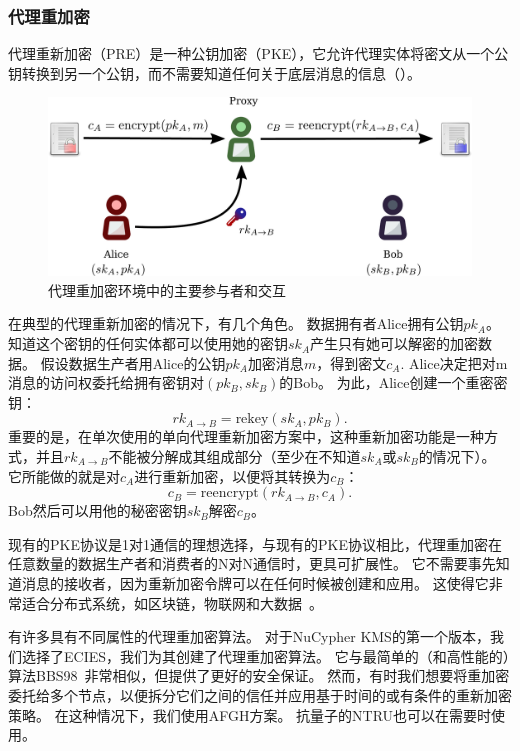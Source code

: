 \documentclass[longbibliography,nofootinbib]{revtex4-1}
\newcommand{\kms}{NuCypher KMS}
\begin{document}
\subsubsection{代理重加密}
代理重新加密（PRE）\cite{wiki:pre,nunez2017proxy}是一种公钥加密（PKE），它允许代理实体将密文从一个公钥转换到另一个公钥，而不需要知道任何关于底层消息的信息（）。

\begin{figure}
\centering
    \includegraphics[width=0.6\columnwidth]{pdf/pre.pdf}
    \caption{代理重加密环境中的主要参与者和交互}
    \label{fig:pre}
\end{figure}

在典型的代理重新加密的情况下，有几个角色。
数据拥有者Alice拥有公钥$pk_A$。
知道这个密钥的任何实体都可以使用她的密钥$sk_A$产生只有她可以解密的加密数据。
假设数据生产者用Alice的公钥$pk_A$加密消息$m$，得到密文$c_A$.
Alice决定把对m消息的访问权委托给拥有密钥对$(pk_B, sk_B)$的Bob。
为此，Alice创建一个重密密钥：
\begin{equation}
    rk_{A\rightarrow B} = \text{rekey}(sk_A, pk_B).
\end{equation}
重要的是，在单次使用的单向代理重新加密方案中，这种重新加密功能是一种方式，并且$rk_{A\rightarrow B}$不能被分解成其组成部分（至少在不知道$sk_A$或$sk_B$的情况下）。
它所能做的就是对$c_A$进行重新加密，以便将其转换为$c_B$：
\begin{equation}
    c_B = \text{reencrypt}(rk_{A\rightarrow B}, c_{A}).
\end{equation}
Bob然后可以用他的秘密密钥$sk_B$解密$c_B$。

现有的PKE协议是1对1通信的理想选择，与现有的PKE协议相比，代理重加密在任意数量的数据生产者和消费者的N对N通信时，更具可扩展性。
它不需要事先知道消息的接收者，因为重新加密令牌可以在任何时候被创建和应用。
这使得它非常适合分布式系统，如区块链，物联网和大数据~\cite{web:nucypher-hadoop}。

有许多具有不同属性的代理重加密算法。
对于\kms 的第一个版本，我们选择了ECIES，我们为其创建了代理重加密算法\cite{umbral-spec}。
它与最简单的（和高性能的）算法BBS98~\cite{BBS98}非常相似，但提供了更好的安全保证。
然而，有时我们想要将重加密委托给多个节点，以便拆分它们之间的信任并应用基于时间的或有条件的重新加密策略。
在这种情况下，我们使用AFGH方案\cite{AFGH}。
抗量子的NTRU也可以在需要时使用\cite{wiki:ntru,ntrureencrypt}。
\end{document}
